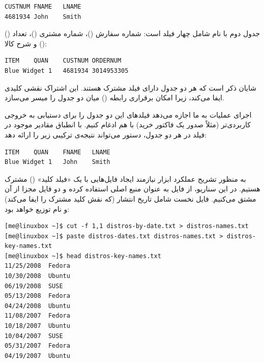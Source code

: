 \begin{latin}
\begin{lstlisting}
CUSTNUM	FNAME	LNAME
4681934	John	Smith
\end{lstlisting}
\end{latin}

جدول دوم با نام  شامل چهار فیلد است: شماره سفارش ()، شماره مشتری ()، تعداد () و شرح کالا ():

\begin{latin}
\begin{lstlisting}
ITEM	QUAN	CUSTNUM	ORDERNUM
Blue Widget	1	4681934	3014953305
\end{lstlisting}
\end{latin}

شایان ذکر است که هر دو جدول دارای فیلد مشترک  هستند. این اشتراک نقشی کلیدی ایفا می‌کند، زیرا امکان برقراری رابطه () میان دو جدول را میسر می‌سازد.

اجرای عملیات  به ما اجازه می‌دهد فیلدهای این دو جدول را برای دستیابی به خروجی کاربردی‌تر (مثلاً صدور یک فاکتور خرید) با هم ادغام کنیم. با انطباق مقادیر موجود در فیلد  در هر دو جدول، دستور  می‌تواند نتیجه‌ی ترکیبی زیر را ارائه دهد:

\begin{latin}
\begin{lstlisting}
ITEM	QUAN	FNAME	LNAME
Blue Widget	1	John	Smith
\end{lstlisting}
\end{latin}

به منظور تشریح عملکرد ابزار  نیازمند ایجاد فایل‌هایی با یک «فیلد کلید» () مشترک هستیم. در این سناریو، از فایل  به عنوان منبع اصلی استفاده کرده و دو فایل مجزا از آن مشتق می‌کنیم. فایل نخست شامل تاریخ انتشار (که نقش کلید مشترک را ایفا می‌کند) و نام توزیع خواهد بود:

\begin{latin}
\begin{lstlisting}
[me@linuxbox ~]$ cut -f 1,1 distros-by-date.txt > distros-names.txt
[me@linuxbox ~]$ paste distros-dates.txt distros-names.txt > distros-key-names.txt
[me@linuxbox ~]$ head distros-key-names.txt
11/25/2008	Fedora
10/30/2008	Ubuntu
06/19/2008	SUSE
05/13/2008	Fedora
04/24/2008	Ubuntu
11/08/2007	Fedora
10/18/2007	Ubuntu
10/04/2007	SUSE
05/31/2007	Fedora
04/19/2007	Ubuntu
\end{lstlisting}
\end{latin}

